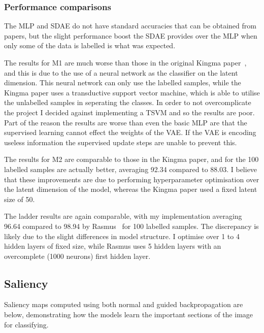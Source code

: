 \subsubsection{Performance comparisons}
The MLP and SDAE do not have standard accuracies that can be obtained from papers, but the slight performance boost the SDAE provides 
over the MLP when only some of the data is labelled is what was expected.

The results for M1 are much worse than those in the original Kingma paper~\cite{DBLP:journals/corr/KingmaRMW14}, and this is due to the use
of a neural network as the classifier on the latent dimension. This neural network can only use the labelled samples, while the Kingma 
paper uses a transductive support vector machine, which is able to utilise the unlabelled samples in seperating the classes. In order to
not overcomplicate the project I decided against implementing a TSVM and so the results are poor. Part of the reason the results are worse 
than even the basic MLP are that the supervised learning cannot effect the weights of the VAE. If the VAE is encoding useless information 
the supervised update steps are unable to prevent this.

The results for M2 are comparable to those in the Kingma paper, and for the 100 labelled samples are actually better, averaging 92.34 
compared to 88.03. I believe that these improvements are due to performing hyperparameter optimisation over the latent dimension of the 
model, whereas the Kingma paper used a fixed latent size of 50.

The ladder results are again comparable, with my implementation averaging 96.64 compared to 98.94 by Rasmus~\cite{DBLP:journals/corr/RasmusVHBR15}
for 100 labelled samples.
The discrepancy is likely due to the slight differences in model structure. I optimise over 1 to 4 hidden layers of fixed size,
while Rasmus uses 5 hidden layers with an overcomplete (1000 neurons) first hidden layer.

\subsection{Saliency}

Saliency maps computed using both normal and guided backpropagation are below, demonstrating how the models learn the important 
sections of the image for classifying.

